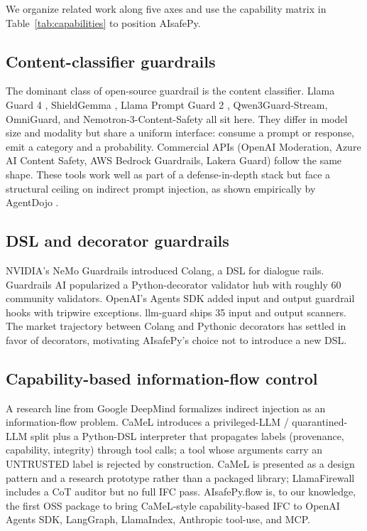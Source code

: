 We organize related work along five axes and use the capability
matrix in Table~\ref{tab:capabilities} to position AIsafePy.

\subsection{Content-classifier guardrails}

The dominant class of open-source guardrail is the content
classifier. Llama Guard 4 \citep{llamaguard}, ShieldGemma
\citep{shieldgemma}, Llama Prompt Guard 2 \citep{promptguard},
Qwen3Guard-Stream, OmniGuard, and Nemotron-3-Content-Safety all sit
here. They differ in model size and modality but share a uniform
interface: consume a prompt or response, emit a category and a
probability. Commercial APIs (OpenAI Moderation, Azure AI Content
Safety, AWS Bedrock Guardrails, Lakera Guard) follow the same shape.
These tools work well as part of a defense-in-depth stack but face a
structural ceiling on indirect prompt injection, as shown
empirically by AgentDojo \citep{debenedetti2024agentdojo}.

\subsection{DSL and decorator guardrails}

NVIDIA's NeMo Guardrails \citep{nemoguardrails} introduced Colang, a
DSL for dialogue rails. Guardrails AI \citep{guardrails} popularized
a Python-decorator validator hub with roughly 60 community
validators. OpenAI's Agents SDK added input and output guardrail
hooks with tripwire exceptions. llm-guard \citep{llmguard} ships 35
input and output scanners. The market trajectory between Colang and
Pythonic decorators has settled in favor of decorators, motivating
AIsafePy's choice not to introduce a new DSL.

\subsection{Capability-based information-flow control}

A research line from Google DeepMind formalizes indirect injection
as an information-flow problem. CaMeL \citep{camel2025} introduces
a privileged-LLM / quarantined-LLM split plus a Python-DSL
interpreter that propagates labels (provenance, capability,
integrity) through tool calls; a tool whose arguments carry an
UNTRUSTED label is rejected by construction. CaMeL is presented
as a design pattern and a research prototype rather than a packaged
library; LlamaFirewall \citep{llamafirewall} includes a CoT auditor
but no full IFC pass. AIsafePy.flow is, to our knowledge, the first
OSS package to bring CaMeL-style capability-based IFC to OpenAI
Agents SDK, LangGraph, LlamaIndex, Anthropic tool-use, and MCP.

